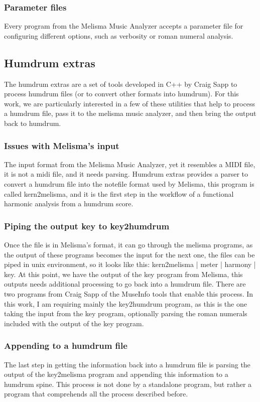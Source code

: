     \subsubsection{Parameter files}
    Every program from the Melisma Music Analyzer accepts a parameter file for configuring different options, such as verbosity or roman numeral analysis.
  \subsection{Humdrum extras}
  The humdrum extras are a set of tools developed in C++ by Craig Sapp to process humdrum files (or to convert other formats into humdrum). For this work, we are particularly interested in a few of these utilities that help to process a humdrum file, pass it to the melisma music analyzer, and then bring the output back to humdrum.
   	\subsubsection{Issues with Melisma's input}
    The input format from the Melisma Music Analyzer, yet it resembles a MIDI file, it is not a midi file, and it needs parsing. Humdrum extras provides a parser to convert a humdrum file into the notefile format used by Melisma, this program is called kern2melisma, and it is the first step in the workflow of a functional harmonic analysis from a humdrum score.
    \subsubsection{Piping the output key to key2humdrum}
    Once the file is in Melisma's format, it can go through the melisma programs, as the output of these programs becomes the input for the next one, the files can be piped in unix environment, so it looks like this: kern2melisma | meter | harmony | key.
    At this point, we have the output of the key program from Melisma, this outputs needs additional processing to go back into a humdrum file. There are two programs from Craig Sapp of the MuseInfo tools that enable this process. In this work, I am requiring mainly the key2humdrum program, as this is the one taking the input from the key program, optionally parsing the roman numerals included with the output of the key program.
    \subsubsection{Appending to a humdrum file}
    The last step in getting the information back into a humdrum file is parsing the output of the key2melisma program and appending this information to a humdrum spine. This process is not done by a standalone program, but rather a program that comprehends all the process described before.
